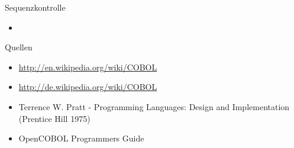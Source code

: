 \documentclass[handout]{beamer}
\begin{document}
\begin{frame}{Sequenzkontrolle}
	\begin{itemize}
		\item
			
	\end{itemize}
\end{frame}

\begin{frame}{Quellen}
	\begin{itemize}
		\item
			\url{http://en.wikipedia.org/wiki/COBOL}
		\item
			\url{http://de.wikipedia.org/wiki/COBOL}
		\item
			Terrence W. Pratt - Programming Languages: Design and Implementation (Prentice Hill 1975)
		\item OpenCOBOL Programmers Guide
	\end{itemize}
\end{frame}
\end{document}
